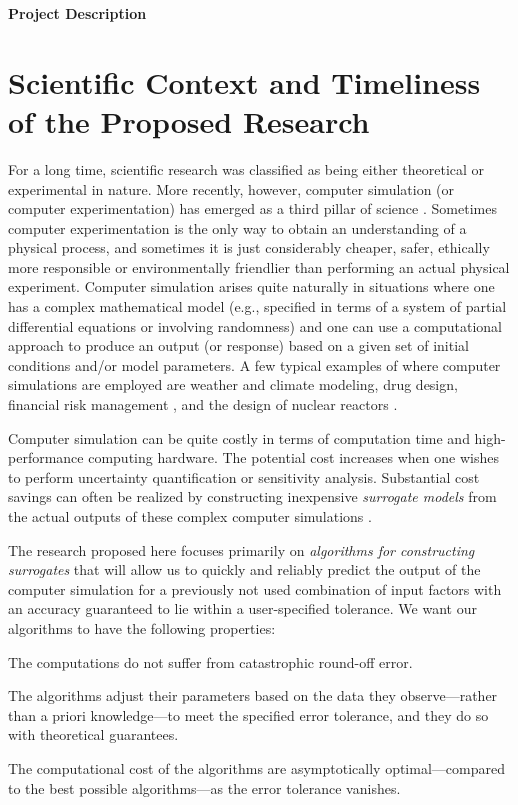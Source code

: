 \documentclass[11pt]{NSFamsart}
\begin{document}

\centerline{\Large \bf Project Description}
\section{Scientific Context and Timeliness of the Proposed Research}
For a long time, scientific research was classified as being either theoretical or experimental in nature. More recently, however, computer simulation (or computer experimentation) has emerged as a third pillar of science \citep{PITAC05,OdenGhattas14}. Sometimes computer experimentation is the only way to obtain an understanding of a physical process, and sometimes it is just considerably cheaper, safer, ethically more responsible or environmentally friendlier than performing an actual physical experiment.
Computer simulation arises quite naturally in situations where one has a complex mathematical model (e.g., specified in terms of a system of partial differential equations or involving randomness) and one can use a computational approach to produce an output (or response) based on a given set of initial conditions and/or model parameters. A few typical examples of where computer simulations are employed are weather and climate modeling, drug design, financial risk management \citep{Gla03}, and the design of nuclear reactors \citep[Sect.\ 2.4]{Smi14a}.

Computer simulation can be quite costly in terms of computation time and high-performance computing hardware.  The potential cost increases when one wishes to perform uncertainty quantification or sensitivity analysis.  Substantial cost savings can often be realized by constructing inexpensive \emph{surrogate models} from the actual outputs of these complex computer simulations \citep{FangEtAl06,ForEtal09,SantnerWilliamsNotz03}.

The research proposed here focuses primarily on \emph{algorithms for constructing surrogates} that will allow us to quickly and reliably predict the output of the computer simulation for a previously not used combination of input factors with an accuracy guaranteed to lie within a user-specified tolerance.  We want our algorithms to have the following properties:
\begin{description}[leftmargin=2.5ex]
\item[Stability] The computations do not suffer from catastrophic round-off error.

\item[Adaptivity] The algorithms adjust their parameters based on the data they observe---rather than a priori knowledge---to meet the specified error tolerance, and they do so with theoretical guarantees.

\item[Efficiency] The computational cost of the algorithms are asymptotically optimal---compared to the best possible algorithms---as the error tolerance vanishes.
\end{description}
\end{document}

